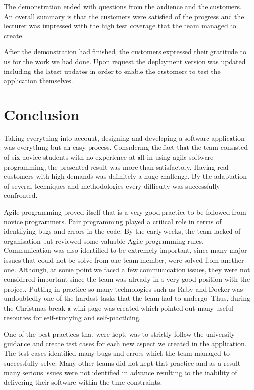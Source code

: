 \documentclass{l3proj}
\begin{document}
The demonstration ended with questions from the audience and the customers. An overall summary is that the customers were satisfied of the progress and the lecturer was impressed with the high test coverage that the team managed to create.

After the demonstration had finished, the customers expressed their gratitude to us for the work we had done. Upon request the deployment version was updated including the latest updates in order to enable the customers to test the application themselves.

\section{Conclusion}

Taking everything into account, designing and developing a software application was everything but an easy process. Considering the fact that the team consisted of six novice students with no experience at all in using agile software programming, the presented result was more than satisfactory. Having real customers with high demands was definitely a huge challenge. By the adaptation of several techniques and methodologies every difficulty was successfully confronted.

Agile programming proved itself that is a very good practice to be followed from novice programmers. Pair programming played a critical role in terms of identifying bugs and errors in the code. By the early weeks, the team lacked of organisation but reviewed some valuable Agile programming rules. Communication was also identified to be extremely important, since many major issues that could not be solve from one team member, were solved from another one. Although, at some point we faced a few communication issues, they were not considered important since the team was already in a very good position with the project. Putting in practice so many technologies such as Ruby and Docker was undoubtedly one of the hardest tasks that the team had to undergo. Thus, during the Christmas break a wiki page was created which pointed out many useful resources for self-studying and self-practicing.

One of the best practices that were kept, was to strictly follow the university guidance and create test cases for each new aspect we created in the application. The test cases identified many bugs and errors which the team managed to successfully solve. Many other teams did not kept that practice and as a result many serious issues were not identified in advance resulting to the inability of delivering their software within the time constraints.
\end{document}

